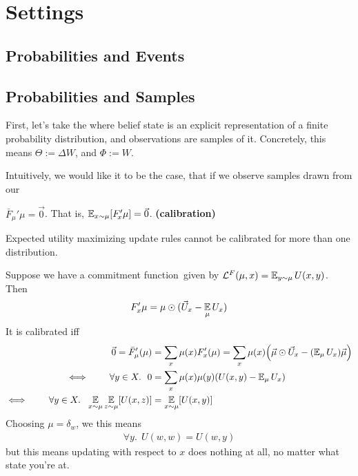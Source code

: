 \documentclass{article}
\def\cofunc{commitment function}
\begin{document}
%
\section{Settings}
\subsection{Probabilities and Events}
\subsection{Probabilities and Samples}

First, let's take the where belief state is an explicit representation of a finite probability distribution, and observations are samples of it. 
Concretely, this means $\Theta := \Delta W$, and $\Phi := W$. 

Intuitively, we would like it to be the case, that if we observe samples drawn from our 

\begin{CFaxioms}
    \item  $\bar F_{\!\mu}'\mu = \vec 0$. 
    That is, $\operatorname*{\mathbb{E}}_{x \sim \mu}[ F'_{\!x}\mu] = \vec 0$.
    \hfill \textbf{(calibration)} \label{ax:calibration}
\end{CFaxioms}


\begin{prop}
    Expected utility maximizing update rules cannot be calibrated for more than one distribution.

\end{prop}
\begin{lproof}
    Suppose we have a \cofunc\ given by
    $\mathcal L^{F}(\mu, x) = \operatorname*{\mathbb{E}}_{y \sim \mu} U(x,y)$.
    Then
    \[ 
        F'_{x} \mu = \mu \odot (\vec U_x - \operatorname*{\mathbb{E}}_{\mu}{U_x})
    \] 
    It is calibrated iff 
    \begin{align*}
        \vec 0 =  \bar F'_\mu(\mu) 
            &= \sum_{x} \mu(x)  F'_{x} (\mu)
            = \sum_{x} \mu(x) \Big( \vec \mu \odot \vec U_x - (\operatorname*{\mathbb{E}}\nolimits_{\mu}{U_x}) \vec \mu \Big) \\
        \iff\qquad
        \forall y \in X.~~
            0 &= \sum_{x} \mu(x) \mu(y) ( U(x,y) - \operatorname*{\mathbb{E}}\nolimits_{\mu} U_x ) \\
        \iff\qquad
        \forall y \in X.~~
            \operatorname*{\mathbb{E}}_{x \sim \mu}\operatorname*{\mathbb{E}}_{z\sim \mu}[ U(x,z) ] &= \operatorname*{\mathbb{E}}_{x \sim \mu}[ U(x,y) ]
    \end{align*} 
    Choosing $\mu = \delta_w$, we this means
    \begin{align*}
        \forall y.~~ U(w,w) = U(w,y)
    \end{align*}
    but this means updating with respect to $x$ does nothing at all, no matter what state you're at.
\end{lproof}
\end{document}

